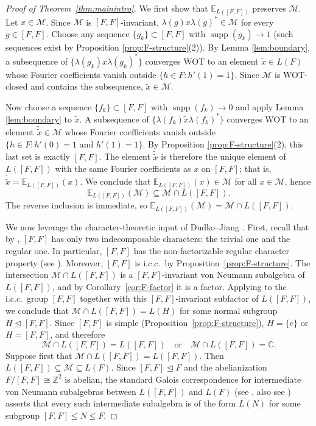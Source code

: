 \documentclass[11pt]{amsart}
\theoremstyle{definition}
\newcommand{\C}{\mathbb{C}}
\newcommand{\Z}{\mathbb{Z}}
\newcommand{\cM}{\mathcal{M}}
\newcommand{\supp}{\operatorname{supp}}
\newcommand{\EE}{\mathbb{E}}
\begin{document}
\begin{proof}[Proof of Theorem~\ref{thm:mainintro}]
We first show that $\EE_{L([F,F])}$ preserves $\cM$. Let $x \in \cM$. Since $\cM$ is $[F,F]$-invariant, $\lambda(g) x \lambda(g)^* \in \cM$ for every $g \in [F,F]$. Choose any sequence $\{g_k\} \subset [F,F]$ with $\supp(g_k) \to 1$ (such sequences exist by Proposition \ref{prop:F-structure}(2)). By Lemma \ref{lem:boundary}, a subsequence of $\{\lambda(g_k) x \lambda(g_k)^*\}$ converges WOT to an element $\tilde{x} \in L(F)$ whose Fourier coefficients vanish outside $\{h \in F : h'(1) = 1\}$. Since $\cM$ is WOT-closed and contains the subsequence, $\tilde{x} \in \cM$.

Now choose a sequence $\{f_k\} \subset [F,F]$ with $\supp(f_k) \to 0$ and apply Lemma \ref{lem:boundary} to $\tilde{x}$. A subsequence of $\{\lambda(f_k) \tilde{x} \lambda(f_k)^*\}$ converges WOT to an element $\tilde{\tilde{x}} \in \cM$ whose Fourier coefficients vanish outside $\{h \in F : h'(0) = 1 \text{ and } h'(1) = 1\}$. By Proposition \ref{prop:F-structure}(2), this last set is exactly $[F,F]$. The element $\tilde{\tilde{x}}$ is therefore the unique element of $L([F,F])$ with the same Fourier coefficients as $x$ on $[F,F]$; that is, $\tilde{\tilde{x}} = \EE_{L([F,F])}(x)$. We conclude that $\EE_{L([F,F])}(x) \in \cM$ for all $x \in \cM$, hence
\[
\EE_{L([F,F])}(\cM) \subseteq \cM \cap L([F,F]).
\]
The reverse inclusion is immediate, so $\EE_{L([F,F])}(\cM) = \cM \cap L([F,F])$. 

We now leverage the character-theoretic input of Dudko--Jiang \cite{DJ24}. 
First, recall that by \cite{DM14}, $[F,F]$ has only two indecomposable characters: the trivial one and the regular one. In particular, $[F,F]$ has the non-factorizable regular character property (see \cite[Proposition~3.10(1)]{DJ24}).
Moreover, $[F,F]$ is i.c.c.\ by Proposition~\ref{prop:F-structure}. The intersection $\cM \cap L([F,F])$ is a $[F,F]$-invariant von Neumann subalgebra of $L([F,F])$, and by Corollary~\ref{cor:F-factor} it is a factor. Applying \cite[Theorem~3.3]{DJ24} to the i.c.c.\ group $[F,F]$ together with this $[F,F]$-invariant subfactor of $L([F,F])$, we conclude that $\cM \cap L([F,F]) = L(H)$ for some normal subgroup $H \trianglelefteq [F,F]$. Since $[F,F]$ is simple (Proposition~\ref{prop:F-structure}), $H = \{e\}$ or $H = [F,F]$, and therefore
\[
\cM \cap L([F,F]) = L([F,F]) \quad \text{or} \quad \cM \cap L([F,F]) = \C.
\]
Suppose first that $\cM \cap L([F,F]) = L([F,F])$. Then $L([F,F]) \subseteq \cM \subseteq L(F)$. Since $[F,F] \trianglelefteq F$ and the abelianization $F/[F,F] \cong \Z^2$ is abelian, the standard Galois correspondence for intermediate von Neumann subalgebras between $L([F,F])$ and $L(F)$ (see \cite[Proposition~4.4]{bedos2023c}, also see \cite[Lemma~3.3]{jiang2021maximal}) asserts that every such intermediate subalgebra is of the form $L(N)$ for some subgroup $[F,F] \le N \le F$. 


\end{proof}
\end{document}
